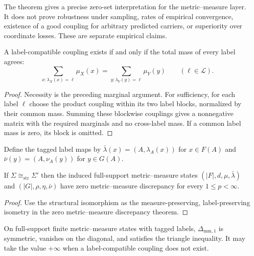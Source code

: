 The theorem gives a precise zero-set interpretation for the metric--measure
layer. It does not prove robustness under sampling, rates of empirical
convergence, existence of a good coupling for arbitrary predicted carriers,
or superiority over coordinate losses. These are separate empirical claims.


\begin{proposition}
A label-compatible coupling exists if and only if the total mass of every
label agrees:
\[
\sum_{x:\lambda_X(x)=\ell}\mu_X(x)
=
\sum_{y:\lambda_Y(y)=\ell}\mu_Y(y)
\qquad(\ell\in\mathcal L).
\]
\end{proposition}

\begin{proof}
Necessity is the preceding marginal argument. For sufficiency, for each label
$\ell$ choose the product coupling within its two label blocks, normalized by
their common mass. Summing these blockwise couplings gives a nonnegative matrix
with the required marginals and no cross-label mass. If a common label mass is
zero, its block is omitted.
\end{proof}

Define the tagged label maps by $\bar\lambda(x)=(A,\lambda_A(x))$ for
$x\in F(A)$ and $\bar\nu(y)=(A,\nu_A(y))$ for $y\in G(A)$.

\begin{corollary}
If $\Sigma\cong_{\mathrm{str}}\Sigma'$ then the induced full-support
metric--measure states $(|F|,d,\mu,\bar\lambda)$ and
$(|G|,\rho,\eta,\bar\nu)$ have zero metric--measure discrepancy for every
$1\leq p<\infty$.
\end{corollary}

\begin{proof}
Use the structural isomorphism as the measure-preserving,
label-preserving isometry in the zero metric--measure discrepancy theorem.
\end{proof}

\begin{proposition}
On full-support finite metric--measure states with tagged labels,
$\Delta_{\mathrm{mm},1}$ is symmetric, vanishes on the diagonal, and satisfies
the triangle inequality. It may take the value $+\infty$ when a
label-compatible coupling does not exist.
\end{proposition}

